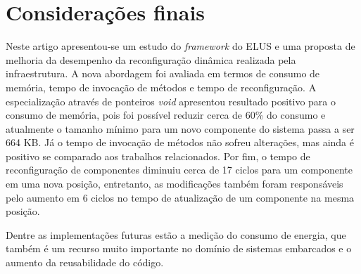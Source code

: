 \documentclass[12pt]{article}
\begin{document}
\section{Considerações finais}
\label{sec:conclusao}
Neste artigo apresentou-se um estudo do \textit{framework} do ELUS e uma proposta de melhoria da desempenho da reconfiguração dinâmica realizada pela infraestrutura. A nova abordagem foi avaliada em termos de consumo de memória, tempo de invocação de métodos e tempo de reconfiguração. A especialização através de ponteiros \textit{void} apresentou resultado positivo para o consumo de memória, pois foi possível reduzir cerca de 60\% do consumo e atualmente o tamanho mínimo para um novo componente do sistema passa a ser 664 KB. Já o tempo de invocação de métodos não sofreu alterações, mas ainda é positivo se comparado aos trabalhos relacionados. Por fim, o tempo de reconfiguração de componentes diminuiu cerca de 17 ciclos para um componente em uma nova posição, entretanto, as modificações também foram responsáveis pelo aumento em 6 ciclos no tempo de atualização de um componente na mesma posição. 

Dentre as implementações futuras estão a medição do consumo de energia, que também é um recurso muito importante no domínio de sistemas embarcados e o aumento da reusabilidade do código.



\end{document}
